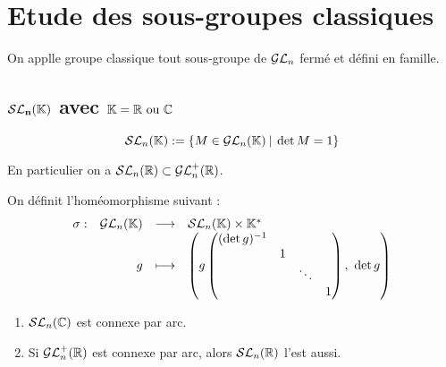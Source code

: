 \section{Etude des sous-groupes classiques}
\vspace{0.5em}

On applle groupe classique tout sous-groupe de $\mathcal{GL}_n$ fermé et défini en
famille.

\subsection[$\mathbf{\SL_n(\K)}$]{$\mathbf{\SL_n(\K)}$ avec $\mathbf{\mathbb{K} = \mathbb{R}
\text{ ou }\mathbb{C}}$}
\vspace{0.5em}

\begin{defi}[$\SL_n(\K)$]
 \begin{displaymath} \mathcal{SL}_n(\mathbb{K}) := \{M\in \mathcal{GL}_n(\mathbb{K}) \: | \: \det M = 1\}
\end{displaymath}

En particulier on a $\mathcal{SL}_n(\mathbb{R}) \subset \mathcal{GL}_n^+(\mathbb{R})$.
\end{defi}

On définit l'homéomorphisme suivant :
\begin{displaymath}  \begin{array}{rrcl}
    \sigma :&\mathcal{GL}_n(\mathbb{K}) &\longrightarrow&\mathcal{SL}_n(\mathbb{K}) \times \mathbb{K}^{*}\hspace{-0.1em} \\
       &     g &\longmapsto    & \left(g \begin{pmatrix}
                                 (\det g)^{-1} &    &        &  \\
                                               & 1  &        &  \\
                                              &    & \ddots &  \\
                                               &    &        & 1
                                \end{pmatrix},\ \det g\right)
   \end{array}\end{displaymath}


\begin{prop}
 \begin{enumerate}
  \item $\mathcal{SL}_n(\mathbb{C})$ est connexe par arc.
  \item Si $\mathcal{GL}_n^+(\mathbb{R})$ est connexe par arc, alors $\mathcal{SL}_n(\mathbb{R})$ l'est aussi.
 \end{enumerate}
\end{prop}

